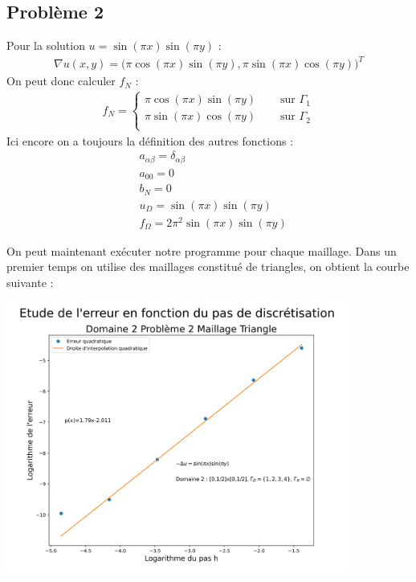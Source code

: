 \documentclass[a4paper, 12pt, french]{report}
\begin{document}
\subsection{Problème 2}
\label{D2P2}
Pour la solution $u=\sin(\pi x)\sin(\pi y)$ :\\
\begin{align*}
    \nabla u(x,y) = \Big( \pi\cos(\pi x)\sin(\pi y) , \pi\sin(\pi x)\cos(\pi y) \Big)^T
\end{align*}
On peut donc calculer $f_N$ :
\begin{align*}
    f_N = \left\{
    \begin{array}{ll}
        \pi\cos(\pi x)\sin(\pi y)  \quad &\text{ sur $\Gamma_1$}\\
        \pi\sin(\pi x)\cos(\pi y)\quad &\text{ sur $\Gamma_2$}\\
    \end{array}
    \right.
\end{align*}
Ici encore on a toujours la définition des autres fonctions :
\begin{align*}
    &a_{\alpha\beta} = \delta_{\alpha\beta}\\
    &a_{00} = 0\\
    &b_N = 0\\
    &u_D = \sin(\pi x)\sin(\pi y)\\
    & f_\Omega = 2\pi^2\sin(\pi x)\sin(\pi y)
\end{align*}

On peut maintenant exécuter notre programme pour chaque maillage.
Dans un premier temps on utilise des maillages constitué de triangles, on obtient la courbe suivante :

\begin{center}
    \includegraphics[height=9cm]{../Images/Courbes_Erreurs/D2P2T.png}
\end{center}
\end{document}

